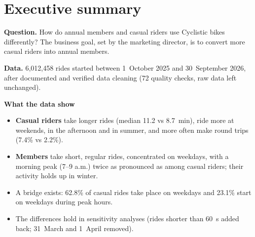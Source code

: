 \clearpage
\section{Executive summary}
\label{sec:summary}

\textbf{Question.} How do annual members and casual riders use Cyclistic bikes differently?
The business goal, set by the marketing director, is to convert more casual riders into annual members.

\textbf{Data.} 6,012,458 rides started between 1~October 2025 and 30~September 2026, after documented and verified data cleaning (72 quality checks, raw data left unchanged).

\begin{center}
\begin{minipage}[t]{0.235\linewidth}\end{minipage}\hfill
\begin{minipage}[t]{0.235\linewidth}\end{minipage}\hfill
\begin{minipage}[t]{0.235\linewidth}\end{minipage}\hfill
\begin{minipage}[t]{0.235\linewidth}\end{minipage}
\end{center}

\textbf{What the data show} \Mes
\begin{itemize}
  \item \textcolor{casual}{\textbf{Casual riders}} take longer rides (median 11.2 vs 8.7~min), ride more at weekends, in the afternoon and in summer, and more often make round trips (7.4\% vs 2.2\%).
  \item \textcolor{member}{\textbf{Members}} take short, regular rides, concentrated on weekdays, with a morning peak (7--9 a.m.) twice as pronounced as among casual riders; their activity holds up in winter.
  \item A bridge exists: 62.8\% of casual rides take place on weekdays and 23.1\% start on weekdays during peak hours.
  \item The differences hold in sensitivity analyses (rides shorter than 60~s added back; 31~March and 1~April removed).
\end{itemize}

